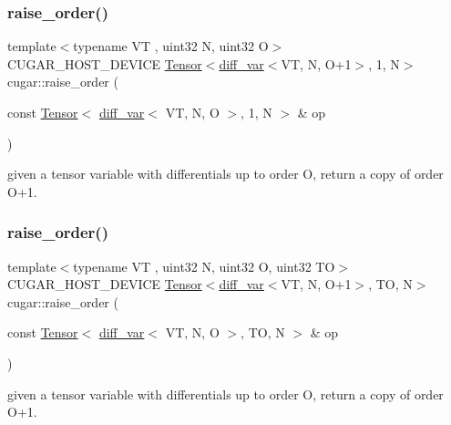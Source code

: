 \subsubsection{\texorpdfstring{raise\+\_\+order()}{raise\_order()}\hspace{0.1cm}{\footnotesize\ttfamily [4/5]}}
{\footnotesize\ttfamily template$<$typename VT , uint32 N, uint32 O$>$ \\
C\+U\+G\+A\+R\+\_\+\+H\+O\+S\+T\+\_\+\+D\+E\+V\+I\+CE \hyperlink{structcugar_1_1_tensor}{Tensor}$<$\hyperlink{structcugar_1_1diff__var}{diff\+\_\+var}$<$VT, N, O+1$>$, 1, N$>$ cugar\+::raise\+\_\+order (\begin{DoxyParamCaption}\item[{const \hyperlink{structcugar_1_1_tensor}{Tensor}$<$ \hyperlink{structcugar_1_1diff__var}{diff\+\_\+var}$<$ VT, N, O $>$, 1, N $>$ \&}]{op }\end{DoxyParamCaption})\hspace{0.3cm}{\ttfamily [inline]}}

given a tensor variable with differentials up to order O, return a copy of order O+1. \mbox{\label{group___auto_diff_module_ga82f8f2fd2da48a18577ce68213e366a3}} 
\subsubsection{\texorpdfstring{raise\+\_\+order()}{raise\_order()}\hspace{0.1cm}{\footnotesize\ttfamily [5/5]}}
{\footnotesize\ttfamily template$<$typename VT , uint32 N, uint32 O, uint32 TO$>$ \\
C\+U\+G\+A\+R\+\_\+\+H\+O\+S\+T\+\_\+\+D\+E\+V\+I\+CE \hyperlink{structcugar_1_1_tensor}{Tensor}$<$\hyperlink{structcugar_1_1diff__var}{diff\+\_\+var}$<$VT, N, O+1$>$, TO, N$>$ cugar\+::raise\+\_\+order (\begin{DoxyParamCaption}\item[{const \hyperlink{structcugar_1_1_tensor}{Tensor}$<$ \hyperlink{structcugar_1_1diff__var}{diff\+\_\+var}$<$ VT, N, O $>$, TO, N $>$ \&}]{op }\end{DoxyParamCaption})\hspace{0.3cm}{\ttfamily [inline]}}

given a tensor variable with differentials up to order O, return a copy of order O+1. \mbox{\label{group___auto_diff_module_gae283602ee3cc33d77e33a2ccdb65e36d}} 
